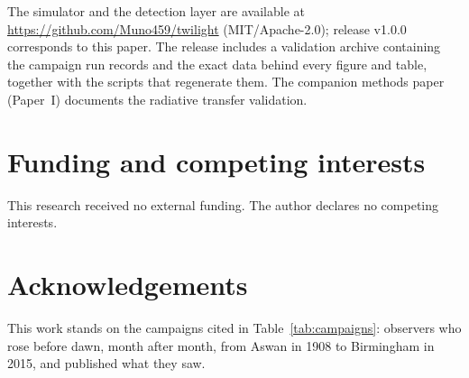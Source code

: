 \documentclass[preprint,12pt]{elsarticle}
\begin{document}
The simulator and the detection layer are available at
\url{https://github.com/Muno459/twilight} (MIT/Apache-2.0); release
v1.0.0 corresponds to this paper. The release includes a validation
archive containing the campaign run records and the exact data behind
every figure and table, together with the scripts that regenerate
them. The companion methods paper (Paper~I) documents the radiative
transfer validation.

\section*{Funding and competing interests}

This research received no external funding. The author declares no
competing interests.

\section*{Acknowledgements}

This work stands on the campaigns cited in Table~\ref{tab:campaigns}:
observers who rose before dawn, month after month, from Aswan in 1908 to
Birmingham in 2015, and published what they saw.
\end{document}
